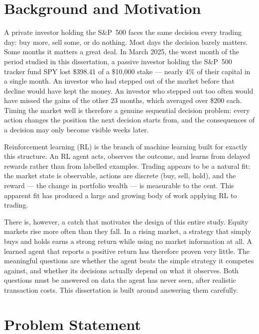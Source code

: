 
\section{Background and Motivation}

A private investor holding the S\&P~500 faces the same decision every
trading day: buy more, sell some, or do nothing. Most days the decision
barely matters. Some months it matters a great deal. In March 2025, the
worst month of the period studied in this dissertation, a passive investor
holding the S\&P~500 tracker fund SPY lost \$398.41 of a \$10,000 stake ---
nearly 4\% of their capital in a single month. An investor who had stepped
out of the market before that decline would have kept the money. An
investor who stepped out too often would have missed the gains of the other
23 months, which averaged over \$200 each. Timing the market well is
therefore a genuine sequential decision problem: every action changes the
position the next decision starts from, and the consequences of a decision
may only become visible weeks later.

Reinforcement learning (RL) is the branch of machine learning built for
exactly this structure. An RL agent acts, observes the outcome, and learns
from delayed rewards rather than from labelled examples. Trading appears to
be a natural fit: the market state is observable, actions are discrete
(buy, sell, hold), and the reward --- the change in portfolio wealth --- is
measurable to the cent. This apparent fit has produced a large and growing
body of work applying RL to trading.

There is, however, a catch that motivates the design of this entire study.
Equity markets rise more often than they fall. In a rising market, a
strategy that simply buys and holds earns a strong return while using no
market information at all. A learned agent that reports a positive return
has therefore proven very little. The meaningful questions are whether the
agent beats the simple strategy it competes against, and whether its
decisions actually depend on what it observes. Both questions must be
answered on data the agent has never seen, after realistic transaction
costs. This dissertation is built around answering them carefully.

\section{Problem Statement}

